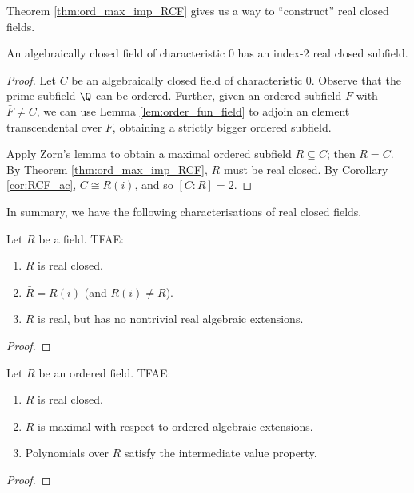 Theorem \ref{thm:ord_max_imp_RCF} gives us a way to ``construct'' real closed fields.

\begin{lemma}
  \label{lem:ACF_ind_2_RCF}
  An algebraically closed field of characteristic 0 has an index-2 real closed subfield.
\end{lemma}
\begin{proof}
  Let $C$ be an algebraically closed field of characteristic 0. Observe that the prime subfield $\Q$ can be ordered. Further, given an ordered subfield $F$ with $\bar{F}\neq C$, we can use Lemma \ref{lem:order_fun_field} to adjoin an element transcendental over $F$, obtaining a strictly bigger ordered subfield.
  
  Apply Zorn's lemma to obtain a maximal ordered subfield $R\subseteq C$; then $\bar{R}=C$. By Theorem \ref{thm:ord_max_imp_RCF}, $R$ must be real closed. By Corollary \ref{cor:RCF_ac}, $C\cong R(i)$, and so $[C:R]=2$.
\end{proof}

In summary, we have the following characterisations of real closed fields.

\begin{theorem}
  \label{thm:RCF_tfae}
  \leanok
  Let $R$ be a field. TFAE:
  \begin{enumerate}
    \item $R$ is real closed.
    \item $\bar{R}=R(i)$ (and $R(i)\neq R$).
    \item $R$ is real, but has no nontrivial real algebraic extensions.
  \end{enumerate}
\end{theorem}
\begin{proof}
  \leanok
\end{proof}

\begin{theorem}
  \label{thm:RCF_tfae_ord}
  \leanok
  Let $R$ be an ordered field. TFAE:
  \begin{enumerate}
    \item $R$ is real closed.
    \item $R$ is maximal with respect to ordered algebraic extensions.
    \item Polynomials over $R$ satisfy the intermediate value property.
  \end{enumerate}
\end{theorem}
\begin{proof}
  \leanok
\end{proof}


